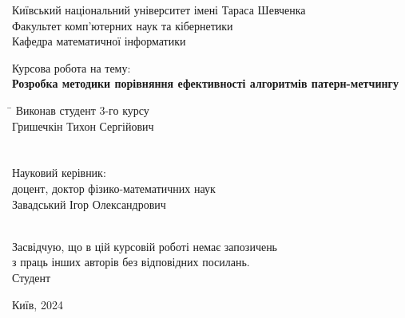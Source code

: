 \documentclass[a4paper,14pt]{extarticle} %
\begin{document}
	

	\begin{titlepage}
		\centering
		\normalsize
		Київський національний університет імені Тараса Шевченка\\
		Факультет комп’ютерних наук та кібернетики\\
		Кафедра математичної інформатики\\
		
		\vspace*{4cm}
		
		\Large Курсова робота на тему: \\
		\textbf{Розробка методики порівняння ефективності алгоритмів патерн-метчингу}
		
		\vspace{2cm}
		
		\normalsize
			\begin{tabbing}
			\hspace{11cm} \= \hspace{5cm} \kill
			Виконав студент 3-го курсу \> \\ 
			Гришечкін Тихон Сергійович \> \underline{\makebox[5cm]{}}\\
			\>  \\
			\\
			Науковий керівник: \> \\ 
			доцент, доктор фізико-математичних наук \> \\
			Завадський Ігор Олександрович \> \underline{\makebox[5cm]{}}\\
			\>  \\
		\end{tabbing}
		
		\vfill
		
		\begin{flushright}
			\normalsize
			Засвідчую, що в цій курсовій роботі немає запозичень \\
			з праць інших авторів без відповідних посилань.\\
			\vspace{1em} %
			\hspace*{0em}Студент \hspace{1cm} \underline{\makebox[5cm]{}}\\
		\end{flushright}
		
		
		\vfill
		
		\centering
		\normalsize
		Київ, 2024
		
	\end{titlepage}
\end{document}
